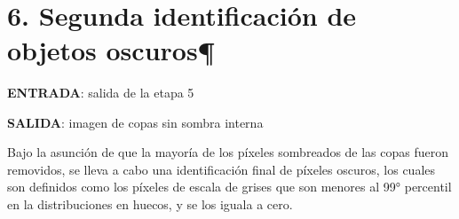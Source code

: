     \begin{center}
    \end{center}
    { \hspace*{\fill} \\}
    
    \begin{center}
    \end{center}
    { \hspace*{\fill} \\}
    
    \begin{center}
    \end{center}
    { \hspace*{\fill} \\}
    
    \hypertarget{segunda-identificaciuxf3n-de-objetos-oscuros}{%
\section{6. Segunda identificación de objetos
oscuros¶}\label{segunda-identificaciuxf3n-de-objetos-oscuros}}

\textbf{ENTRADA}: salida de la etapa 5

\textbf{SALIDA}: imagen de copas sin sombra interna

Bajo la asunción de que la mayoría de los píxeles sombreados de las
copas fueron removidos, se lleva a cabo una identificación final de
píxeles oscuros, los cuales son definidos como los píxeles de escala de
grises que son menores al 99° percentil en la distribuciones en huecos,
y se los iguala a cero.

